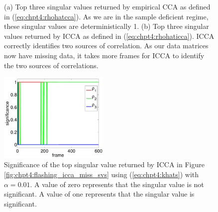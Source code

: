 \begin{figure}
  \begin{center}
    \caption{(a) Top three singular values returned by empirical CCA as defined in
      (\ref{eq:chpt4:rhohatcca}). As we are in the sample deficient regime, these singular
      values are deterministically 1. (b) Top three singular values returned by ICCA as
      defined in (\ref{eq:chpt4:rhohaticca}). ICCA correctly identifies two sources of
      correlation. As our data matrices now have missing data, it takes more frames for
      ICCA to identify the two sources of correlations.}
    \label{fig:chpt4:flashing_corrs_miss}
  \end{center}
\end{figure}

\begin{figure}
  \begin{center}
    \includegraphics[width=0.47\textwidth]{chpt4_det_corr/figs/icca_sigs_miss.pdf}
    \caption{Significance of the top singular value returned by ICCA in Figure
      \ref{fig:chpt4:flashing_icca_miss_svs} using (\ref{eq:chpt4:khats}) with $\alpha=0.01$. A
      value of zero represents that the singular value is not significant. A value of one
      represents that the singular value is significant.}
    \label{fig:chpt4:flashing_sigs_miss}
  \end{center}
\end{figure}

